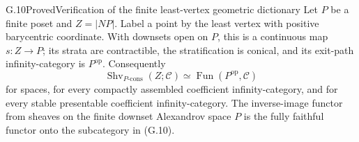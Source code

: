 \begin{claim}{G.10}{Proved}{Verification of the finite least-vertex geometric dictionary}
Let $P$ be a finite poset and $Z=|NP|$. Label a point by the
least vertex with positive barycentric coordinate. With downsets
open on $P$, this is a continuous map $s:Z\to P$; its strata are
contractible, the stratification is conical, and its exit-path
infinity-category is $P^{\mathrm{op}}$. Consequently
\[
 \operatorname{Shv}_{P\text{-}\mathrm{cons}}(Z;\mathcal C)
       \simeq\operatorname{Fun}(P^{\mathrm{op}},\mathcal C)
\tag{G.10}
\]
for spaces, for every compactly assembled coefficient
infinity-category, and for every stable presentable coefficient
infinity-category. The inverse-image functor from sheaves on the
finite downset Alexandrov space $P$ is the fully faithful functor
onto the subcategory in (G.10).
\end{claim}
